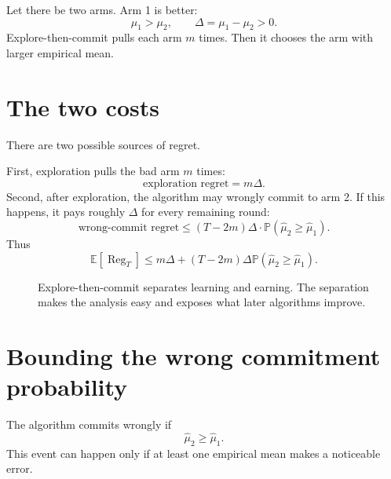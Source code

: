\documentclass[en,nofont,11pt]{elegantbook}
\newcommand{\E}{\mathbb{E}}
\newcommand{\Pp}{\mathbb{P}}
\providecommand{\Reg}{\operatorname{Reg}}
\begin{document}
Let there be two arms. Arm 1 is better:
\[
\mu_1>\mu_2,
\qquad
\Delta=\mu_1-\mu_2>0.
\]
Explore-then-commit pulls each arm $m$ times. Then it chooses the arm with larger empirical mean.

\section{The two costs}

There are two possible sources of regret.

First, exploration pulls the bad arm $m$ times:
\[
\text{exploration regret}=m\Delta.
\]
Second, after exploration, the algorithm may wrongly commit to arm 2. If this happens, it pays roughly $\Delta$ for every remaining round:
\[
\text{wrong-commit regret}\leq (T-2m)\Delta\cdot \Pp(\widehat\mu_2\geq \widehat\mu_1).
\]
Thus
\[
\E[\Reg_T]
\leq
m\Delta+(T-2m)\Delta\Pp(\widehat\mu_2\geq \widehat\mu_1).
\]

\begin{figure}[h]
\centering
{}
\caption{Explore-then-commit separates learning and earning. The separation makes the analysis easy and exposes what later algorithms improve.}
\end{figure}

\section{Bounding the wrong commitment probability}

The algorithm commits wrongly if
\[
\widehat\mu_2\geq \widehat\mu_1.
\]
This event can happen only if at least one empirical mean makes a noticeable error.
\end{document}
